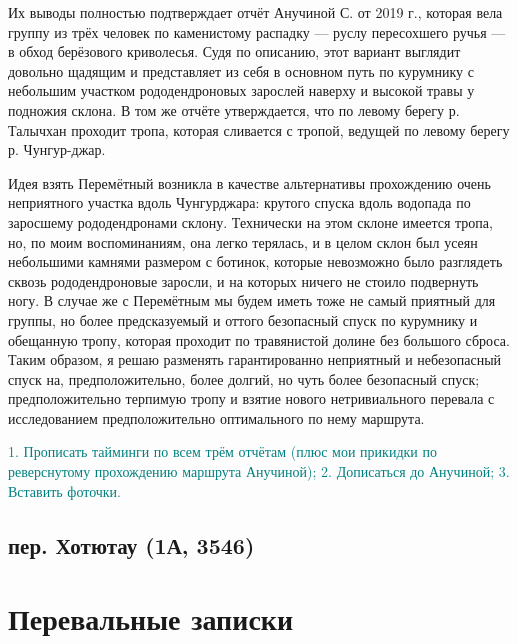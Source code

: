 \documentclass[a4paper, 12pt]{report}
\begin{document}
Их выводы полностью подтверждает отчёт Анучиной С. от 2019 г., которая вела группу из трёх человек по каменистому распадку --- руслу пересохшего ручья --- в обход берёзового криволесья. Судя по описанию, этот вариант выглядит довольно щадящим и представляет из себя в основном путь по курумнику с небольшим участком рододендроновых зарослей наверху и высокой травы у подножия склона. В том же отчёте утверждается, что по левому берегу р. Талычхан проходит тропа, которая сливается с тропой, ведущей по левому берегу р. Чунгур-джар. 

Идея взять Перемётный возникла в качестве альтернативы прохождению очень неприятного участка вдоль Чунгурджара: крутого спуска вдоль водопада по заросшему рододендронами склону. Технически на этом склоне имеется тропа, но, по моим воспоминаниям, она легко терялась, и в целом склон был усеян небольшими камнями размером с ботинок, которые невозможно было разглядеть сквозь рододендроновые заросли, и на которых ничего не стоило подвернуть ногу. В случае же с Перемётным мы будем иметь тоже не самый приятный для группы, но более предсказуемый и оттого безопасный спуск по курумнику и обещанную тропу, которая проходит по травянистой долине без большого сброса. Таким образом, я решаю разменять гарантированно неприятный и небезопасный спуск на, предположительно, более долгий, но чуть более безопасный спуск; предположительно терпимую тропу и взятие нового нетривиального перевала с исследованием предположительно оптимального по нему маршрута.

\textcolor{teal}{1. Прописать тайминги по всем трём отчётам (плюс мои прикидки по реверснутому прохождению маршрута Анучиной); 2. Дописаться до Анучиной; 3. Вставить фоточки.}

\subsection{пер. Хотютау (1А, 3546)} 

\appendix
\section{Перевальные записки}
\end{document}
